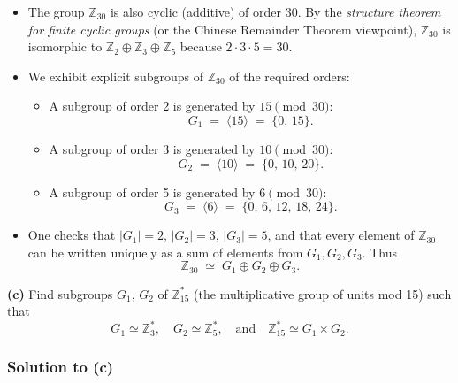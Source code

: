 \documentclass[12pt]{article}
\theoremstyle{definition} %
\theoremstyle{plain} %
\begin{document}
\begin{itemize}
  \item The group $\mathbb{Z}_{30}$ is also cyclic (additive) of order 30. By the \emph{structure theorem for finite cyclic groups} (or the Chinese Remainder Theorem viewpoint), $\mathbb{Z}_{30}$ is isomorphic to $\mathbb{Z}_2 \oplus \mathbb{Z}_3 \oplus \mathbb{Z}_5$ because $2 \cdot 3 \cdot 5 = 30$.
  \item We exhibit explicit subgroups of $\mathbb{Z}_{30}$ of the required orders:
    \begin{itemize}
      \item A subgroup of order 2 is generated by $15 \pmod{30}$:
      \[
        G_1 \;=\; \langle 15\rangle \;=\; \{0,\,15\}.
      \]
      \item A subgroup of order 3 is generated by $10 \pmod{30}$:
      \[
        G_2 \;=\; \langle 10\rangle \;=\; \{0,\,10,\,20\}.
      \]
      \item A subgroup of order 5 is generated by $6 \pmod{30}$:
      \[
        G_3 \;=\; \langle 6\rangle \;=\; \{0,\,6,\,12,\,18,\,24\}.
      \]
    \end{itemize}
  \item One checks that $|G_1|=2$, $|G_2|=3$, $|G_3|=5$, and that every element of $\mathbb{Z}_{30}$ can be written uniquely as a sum of elements from $G_1, G_2, G_3$.  Thus
  \[
    \mathbb{Z}_{30} \;\simeq\; G_1 \oplus G_2 \oplus G_3.
  \]
\end{itemize}

\bigskip

\noindent\textbf{(c)} Find subgroups $G_1,\,G_2$ of $\mathbb{Z}_{15}^*$ (the multiplicative group of units mod 15) such that 
\[
  G_1 \simeq \mathbb{Z}_3^*, 
  \quad
  G_2 \simeq \mathbb{Z}_5^*,
  \quad\text{and}\quad
  \mathbb{Z}_{15}^* \simeq G_1 \times G_2.
\]

\subsubsection*{Solution to (c)}
\end{document}
